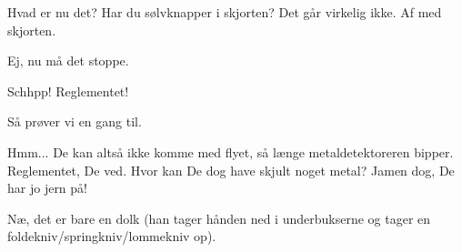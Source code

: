 \documentclass[a4paper,11pt]{article}
\begin{document}
\begin{sketch}

 Hvad er nu det? Har du sølvknapper i skjorten? Det går virkelig ikke. Af med skjorten.

 Ej, nu må det stoppe.

 Schhpp! Reglementet!


 Så prøver vi en gang til.


 Hmm... De kan altså ikke komme med flyet, så længe metaldetektoreren bipper. Reglementet, De ved. Hvor kan De dog have skjult noget metal? Jamen dog, De har jo jern på!

  Næ, det er bare en dolk (han tager hånden ned i underbukserne og tager en foldekniv/springkniv/lommekniv op).

\end{sketch}
\end{document}
